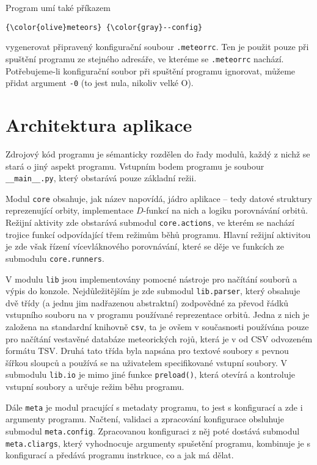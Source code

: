\medskip

Program umí také příkazem
\begin{Verbatim}[commandchars=\\\{\},gobble=4,formatcom=\small]
    {\color{olive}meteors} {\color{gray}--config}
\end{Verbatim}
vygenerovat připravený konfigurační soubour \texttt{.meteorrc}. Ten je použit pouze při spuštění programu ze stejného adresáře, ve kteréme se \texttt{.meteorrc} nachází. Potřebujeme-li konfigurační soubor při spuštění programu ignorovat, můžeme přidat argument \texttt{-0} (to jest nula, nikoliv velké O).

\section{Architektura aplikace}%
Zdrojový kód programu je sémanticky rozdělen do řady modulů, každý z nichž se stará o jiný aspekt programu. Vstupním bodem programu je soubour \texttt{\_\_main\_\_.py}, který obstarává pouze základní režii.

\smallskip

Modul \texttt{core} obsahuje, jak název napovídá, jádro aplikace -- tedy datové struktury reprezenující orbity, implementace $D$-funkcí na nich a logiku porovnávání orbitů. Režijní aktivity zde obstarává submodul \texttt{core.actions}, ve kterém se nachází trojice funkcí odpovídající třem režimům běhů programu. Hlavní režijní aktivitou je zde však řízení vícevláknového porovnávání, které se děje ve funkcích ze submodulu \texttt{core.runners}.

V modulu \texttt{lib} jsou implementovány pomocné nástroje pro načítání souborů a výpis do konzole. Nejdůležitějším je zde submodul \texttt{lib.parser}, který obsahuje dvě třídy (a jednu jim nadřazenou abstraktní) zodpovědné za převod řádků vstupního souboru na v programu používané reprezentace orbitů. Jedna z nich je založena na standardní knihovně \texttt{csv}, ta je ovšem v současnosti používána pouze pro načítání vestavěné databáze meteorických rojů, která je v od CSV odvozeném formátu TSV. Druhá tato třída byla napsána pro textové soubory s pevnou šířkou sloupců a používá se na uživatelem specifikované vstupní soubory. V submodulu \texttt{lib.io} je mimo jiné funkce \texttt{preload()}, která otevírá a kontroluje vstupní soubory a určuje režim běhu programu.

Dále \texttt{meta} je modul pracující s metadaty programu, to jest s konfigurací a zde i argumenty programu. Načtení, validaci a zpracování konfigurace obsluhuje submodul \texttt{meta.config}. Zpracovanou konfiguraci z něj poté dostává submodul \texttt{meta.cliargs}, který vyhodnocuje argumenty spušetění programu, kombinuje je s konfigurací a předává programu instrkuce, co a jak má dělat.

